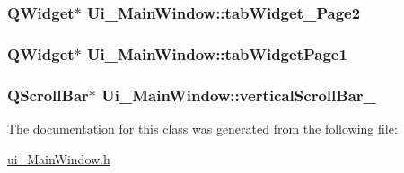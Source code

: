 \subsubsection[{tab\+Widget\+\_\+2\+Page2}]{\setlength{\rightskip}{0pt plus 5cm}Q\+Widget$\ast$ Ui\+\_\+\+Main\+Window\+::tab\+Widget\+\_\+Page2}\label{classUi__MainWindow_a4926c6794c8803e2973a03e3fae0a42d}
\hypertarget{classUi__MainWindow_a9ab66644017a77a0b3e39f1344ef9d0e}{}
\subsubsection[{tab\+Widget\+Page1}]{\setlength{\rightskip}{0pt plus 5cm}Q\+Widget$\ast$ Ui\+\_\+\+Main\+Window\+::tab\+Widget\+Page1}\label{classUi__MainWindow_a9ab66644017a77a0b3e39f1344ef9d0e}
\hypertarget{classUi__MainWindow_a1f43790be11311624c245154d0259019}{}
\subsubsection[{vertical\+Scroll\+Bar\+\_\+2}]{\setlength{\rightskip}{0pt plus 5cm}Q\+Scroll\+Bar$\ast$ Ui\+\_\+\+Main\+Window\+::vertical\+Scroll\+Bar\+\_}\label{classUi__MainWindow_a1f43790be11311624c245154d0259019}


The documentation for this class was generated from the following file\+:\begin{DoxyCompactItemize}
\item 
\hyperlink{ui__MainWindow_8h}{ui\+\_\+\+Main\+Window.\+h}\end{DoxyCompactItemize}
